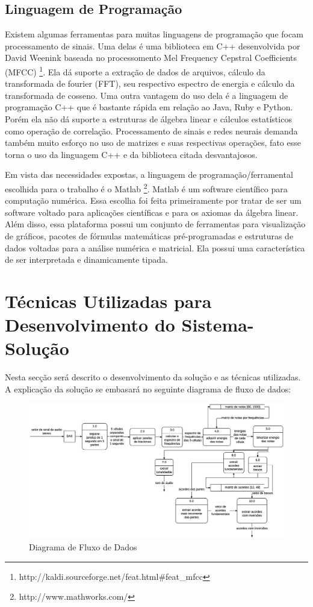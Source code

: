\subsection{Linguagem de Programação}

Existem algumas ferramentas para muitas linguagens de programação que focam processamento de sinais. Uma delas é uma biblioteca em C++ desenvolvida por David Weenink baseada no processomento Mel Frequency Cepstral Coefficients (MFCC) \footnote{http://kaldi.sourceforge.net/feat.html\#feat\_mfcc}. Ela dá suporte a extração de dados de arquivos, cálculo da transformada de fourier (FFT), seu respectivo espectro de energia e cálculo da transformada de cosseno. Uma outra vantagem do uso dela é a linguagem de programação C++ que é bastante rápida em relação ao Java, Ruby e Python. Porém ela não dá suporte a estruturas de álgebra linear e cálculos estatísticos como operação de correlação. Processamento de sinais e redes neurais demanda também muito esforço no uso de matrizes e suas respectivas operações, fato esse torna o uso da linguagem C++ e da biblioteca citada desvantajosos.

Em vista das necessidades expostas, a linguagem de programação/ferramental escolhida para o trabalho é o Matlab \footnote{http://www.mathworks.com/}. Matlab é um software científico para computação numérica. Essa escolha foi feita primeiramente por tratar de ser um software voltado para aplicações científicas e para os axiomas da álgebra linear. Além disso, essa plataforma possui um conjunto de ferramentas para visualização de gráficos, pacotes de fórmulas matemáticas pré-programadas e estruturas de dados voltadas para a análise numérica e matricial. Ela possui uma característica de ser interpretada e dinamicamente tipada.

\section{Técnicas Utilizadas para Desenvolvimento do Sistema-Solução}

Nesta secção será descrito o desenvolvimento da solução e as técnicas utilizadas. A explicação da solução se embasará no seguinte diagrama de fluxo de dados:

\begin{figure}[h]
	\centering
		\includegraphics[keepaspectratio=true,scale=0.49]{figuras/dfd_2.eps}
	\caption{Diagrama de Fluxo de Dados}
\end{figure}

